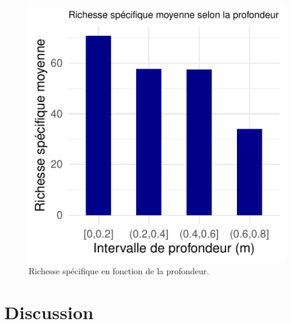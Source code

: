 \documentclass[9pt,twocolumn,twoside,]{pnas-new}
\begin{document}
\begin{figure}

{\centering \includegraphics{RMarkdown-article_files/figure-latex/fig_profondeur-1} 

}

\caption{Richesse spécifique en fonction de la profondeur.}\label{fig:fig_profondeur}
\end{figure}

\section{Discussion}\label{discussion}
\end{document}
